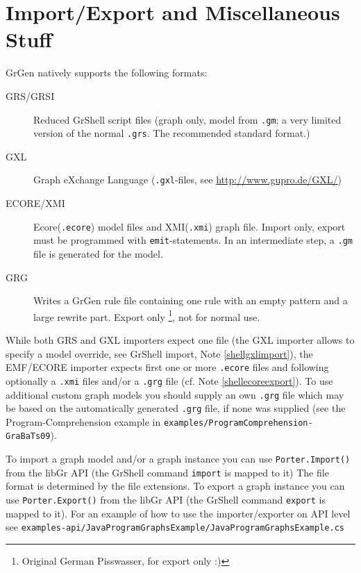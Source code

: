 \section{Import/Export and Miscellaneous Stuff}\label{sub:imexport}

GrGen natively supports the following formats:
\begin{description}
  \item[GRS/GRSI] Reduced GrShell script files (graph only, model from \texttt{.gm}; a very limited version of the normal \texttt{.grs}. The recommended standard format.)
  \item[GXL] Graph eXchange Language (\texttt{.gxl}-files, see \url{http://www.gupro.de/GXL/})
  \item[ECORE/XMI] Ecore(\texttt{.ecore}) model files and XMI(\texttt{.xmi}) graph file. Import only, export must be programmed with \texttt{emit}-statements. In an intermediate step, a \texttt{.gm} file is generated for the model.
    \item[GRG] Writes a GrGen rule file containing one rule with an empty pattern and a large rewrite part. Export only \footnote{Original German Pisswasser, for export only :)}, not for normal use.
\end{description}

While both GRS and GXL importers expect one file
(the GXL importer allows to specify a model override, see GrShell import, Note \ref{shellgxlimport}),
the EMF/ECORE importer expects first one or more \texttt{.ecore} files
and following optionally a \texttt{.xmi} files and/or a \texttt{.grg} file (cf. Note \ref{shellecoreexport}). 
To use additional custom graph models you should supply an own \texttt{.grg}
file which may be based on the automatically generated \texttt{.grg} file, if none was
supplied (see the Program-Comprehension example in \texttt{examples/ProgramComprehension-GraBaTs09}).

To import a graph model and/or a graph instance you can use \texttt{Porter.Import()} from the libGr API (the GrShell command \texttt{import} is mapped to it)
The file format is determined by the file extensions.
To export a graph instance you can use \texttt{Porter.Export()} from the libGr API (the GrShell command \texttt{export} is mapped to it).
For an example of how to use the importer/exporter on API level see \texttt{examples-api/JavaProgramGraphsExample/JavaProgramGraphs\-Example.cs}

